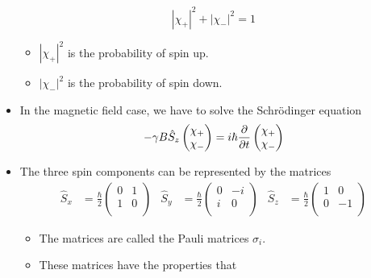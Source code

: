 \documentclass[../notes.tex]{subfiles}
\begin{document}
\begin{itemize}
\begin{equation*}
        |\chi_+|^2+|\chi_-|^2 = 1
    \end{equation*}
    \begin{itemize}
        \item $|\chi_+|^2$ is the probability of spin up.
        \item $|\chi_-|^2$ is the probability of spin down.
    \end{itemize}
    \item In the magnetic field case, we have to solve the Schr\"{o}dinger equation
    \begin{equation*}
        -\gamma B\hat{S}_z
        \begin{pmatrix}
            \chi_+\\
            \chi_-\\
        \end{pmatrix}
        = i\hbar\pdv{t}
        \begin{pmatrix}
            \chi_+\\
            \chi_-\\
        \end{pmatrix}
    \end{equation*}
    \item The three spin components can be represented by the matrices
    \begin{align*}
        \hat{S}_x &= \frac{\hbar}{2}
        \begin{pmatrix}
            0 & 1\\
            1 & 0\\
        \end{pmatrix}&
        \hat{S}_y &= \frac{\hbar}{2}
        \begin{pmatrix}
            0 & -i\\
            i & 0\\
        \end{pmatrix}&
        \hat{S}_z &= \frac{\hbar}{2}
        \begin{pmatrix}
            1 & 0\\
            0 & -1\\
        \end{pmatrix}
    \end{align*}
    \begin{itemize}
        \item The matrices are called the Pauli matrices $\sigma_i$.
        \item These matrices have the properties that
        \begin{align*}

\end{align*}
\end{itemize}
\end{itemize}
\end{document}
